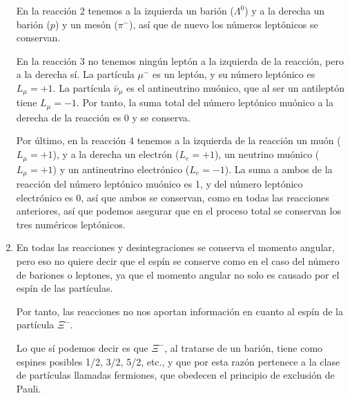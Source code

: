 \begin{enumerate}
    En la reacción 2 tenemos a la izquierda un barión ($\Lambda^0$) y a la derecha un barión ($p$) y un mesón  ($\pi^-$),
    así que de nuevo los números leptónicos se conservan.

    En la reacción 3 no tenemos ningún leptón a la izquierda de la reacción, pero a la derecha sí.
    La partícula $\mu^-$ es un leptón, y su número leptónico es $L_\mu = +1$.
    La partícula $\bar{\nu}_{\mu}$ es el antineutrino muónico, que al ser un antileptón tiene $L_\mu = -1$.
    Por tanto, la suma total del número leptónico muónico a la derecha de la reacción es 0 y se conserva.

    Por último, en la reacción 4 tenemos a la izquierda de la reacción un muón ($L_\mu = +1$), y a la derecha un electrón
    ($L_e = +1$), un neutrino muónico ($L_\mu = +1$) y un antineutrino electrónico ($L_e = -1$).
    La suma a ambos de la reacción del número leptónico muónico es 1, y del número leptónico electrónico es 0, así que
    ambos se conservan, como en todas las reacciones anteriores, así que podemos asegurar
    que en el proceso total se conservan los tres numéricos leptónicos.


    \vspace{20px}

    \item En todas las reacciones y desintegraciones se conserva el momento angular, pero eso no quiere decir que el espín
    se conserve como en el caso del número de bariones o leptones, ya que el momento angular no solo es causado por el espín de las
    partículas.

    Por tanto, las reacciones no nos aportan información en cuanto al espín de la partícula $\Xi^-$.

    Lo que sí podemos decir es que  $\Xi^-$, al tratarse de un barión, tiene como espines posibles 1/2, 3/2, 5/2, etc.,
    y que por esta razón pertenece a la clase de partículas llamadas fermiones, que obedecen el principio de exclusión de Pauli.


\end{enumerate}

